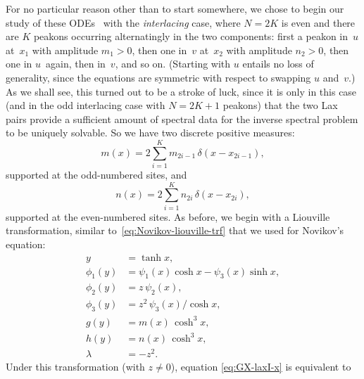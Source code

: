 \documentclass[10pt,a4paper]{article} \pdfoutput=1 
\begin{document}
For no particular reason other than to start somewhere,
we chose to begin our study of these
ODEs~\cite{lundmark-szmigielski:2016:GX-inverse-problem,lundmark-szmigielski:2017:GX-dynamics-interlacing}
with the \emph{interlacing} case, where $N=2K$ is even
and there are $K$ peakons occurring alternatingly
in the two components:
first a peakon in~$u$ at~$x_1$ with amplitude $m_1 > 0$,
then one in~$v$ at~$x_2$ with amplitude $n_2 > 0$, then one in $u$~again, then in~$v$, and so on.
(Starting with $u$ entails no loss of generality, since the equations are symmetric with
respect to swapping $u$ and~$v$.)
As we shall see, this turned out to be a stroke of luck,
since it is only in this case (and in the odd interlacing case with $N=2K+1$ peakons)
that the two Lax pairs provide a sufficient amount of
spectral data for the inverse spectral problem to be uniquely solvable.
So we have two discrete positive measures:
\begin{equation*}
  m(x) = 2 \sum_{i=1}^K m_{2i-1} \, \delta(x - x_{2i-1})
  ,
\end{equation*}
supported at the odd-numbered sites, and
\begin{equation*}
  n(x) = 2 \sum_{i=1}^K n_{2i} \, \delta(x - x_{2i})
  ,
\end{equation*}
supported at the even-numbered sites.
As before, we begin with a Liouville transformation,
similar to~\eqref{eq:Novikov-liouville-trf}
that we used for Novikov's equation:
\begin{equation}
  \label{eq:GX-liouville-trf}
  \begin{split}
    y &= \tanh x,\\
    \phi_1(y) &= \psi_1(x) \cosh x - \psi_3(x) \sinh x,\\
    \phi_2(y) &= z \, \psi_2(x),\\
    \phi_3(y) &= z^2 \, \psi_3(x) / \cosh x,\\
    g(y) &= m(x) \, \cosh^3 x,\\
    h(y) &= n(x) \, \cosh^3 x,\\
    \lambda &= -z^2.
  \end{split}
\end{equation}
Under this transformation (with $z\neq 0$),
equation \eqref{eq:GX-laxI-x} is equivalent to
\end{document}

